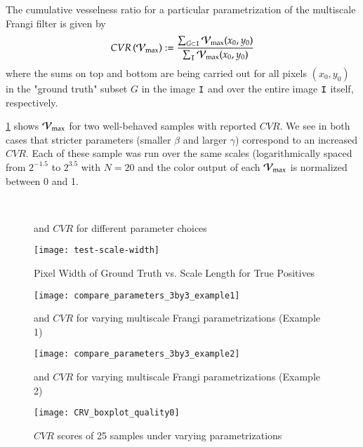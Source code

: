 \begin{defn} The cumulative vesselness ratio for a particular parametrization of the multiscale Frangi filter is given by
	\begin{equation}
	CVR\left(\mathcal{V}_{\max}\right) := \frac{\sum_{G\subset\mathtt{I}} \mathcal{V}_{\max}(x_0, y_0)}{\sum_{\mathtt{I}} \mathcal{V}_{\max}(x_0,y_0)}
	\end{equation}
	where the sums on top and bottom are being carried out for all pixels $(x_0,y_0)$ in the "ground truth" subset $G$ in the image $\mathtt{I}$
	and over the entire image $\mathtt{I}$ itself, respectively.
\end{defn}

\cref{fig:compare_parameters} shows $\mathcal{V}_{\max}$ for two well-behaved samples with reported $CVR$. We see in both cases that stricter parameters (smaller $\beta$ and larger $\gamma$) correspond to an increased $CVR$. Each of these sample was run over the same scales (logarithmically spaced from $2^{-1.5}$ to $2^{3.5}$ with $N=20$ and the color output of each $\mathcal{V}_{\max}$ is normalized between 0 and 1.

\begin{figure}[p]\centering
	\\
	\caption{\Vmax  and $CVR$ for different parameter choices}
	\label{fig:compare_parameters}
\end{figure}

\begin{figure}[p]
  \texttt{[image: test-scale-width]}
  \caption{Pixel Width of Ground Truth vs. Scale Length for True Positives}
\end{figure}

\begin{figure}[p]\centering
		\texttt{[image: compare\_parameters\_3by3\_example1]}
	\caption{\Vmax  and $CVR$ for varying multiscale Frangi parametrizations (Example 1)}
	\label{fig:compare_parameters_3by3_example1}
\end{figure}

\begin{figure}[p]\centering
	\texttt{[image: compare\_parameters\_3by3\_example2]}
	\caption{\Vmax  and $CVR$ for varying multiscale Frangi parametrizations (Example 2)}
	\label{fig:compare_parameters_3by3_example2}
\end{figure}

\begin{figure}\centering
	\texttt{[image: CRV\_boxplot\_quality0]}
	\caption{$CVR$ scores of 25 samples under varying parametrizations}
  \label{fig:CVR-boxplot-quality0}
\end{figure}

